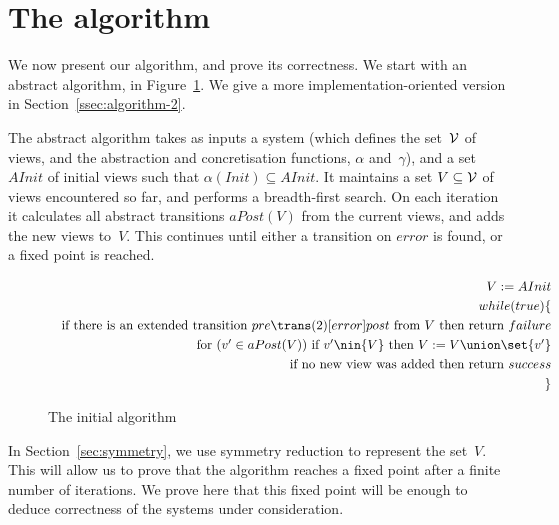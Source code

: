 \section{The algorithm}
\label{sec:algorithm}

We now present our algorithm, and prove its correctness.  We start with an
abstract algorithm, in Figure~\ref{fig:algorithm}.  We give a more
implementation-oriented version in Section~\ref{ssec:algorithm-2}.

The abstract algorithm takes as inputs a system (which defines the set~$\mathcal{V}$ of
views, and the abstraction and concretisation functions, $\alpha$
and~$\gamma$), and a set $AInit$ of initial views such that $\alpha(Init)
\subseteq {AInit}$.  It maintains a set $V \subseteq \mathcal{V}$ of views encountered
so far, and performs a breadth-first search.  On each iteration it calculates
all abstract transitions $aPost(V)$ from the current views, and adds the
new views to~$V$.  This continues until either a transition on $error$ is
found, or a fixed point is reached.

\begin{figure}[t]
\[
\begin{align}
V := AInit \\
while(true)\{ \\
\quad \mbox{if there is an extended transition $pre \trans(2)[error] post$
  from~${V}$ then return $failure$} \\
\quad \mbox{for $(v' \in aPost(V))$ if $v' \nin {V}$ then 
  $V := V \union \set{v'}$} \\
\quad \mbox{if no new view was added then return $success$} \\ 
\}
\end{align}
\]
\caption{The initial algorithm}
\label{fig:algorithm}
\end{figure}


In Section~\ref{sec:symmetry}, we use symmetry reduction to represent the
set~$V$.  This will allow us to prove that the algorithm reaches a fixed point
after a finite number of iterations.  We prove here that this fixed point will
be enough to deduce correctness of the systems under consideration. 


